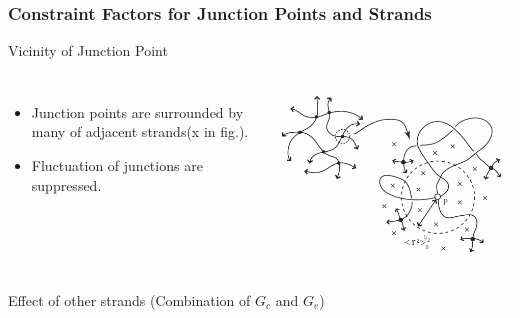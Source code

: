 \documentclass[12pt, dvipdfmx]{beamer}
\begin{document}
\begin{frame}
	\frametitle{Constraint Factors for Junction Points and Strands}
		\vspace{-2mm}
		\begin{alertblock}{Vicinity of Junction Point}
			\begin{columns}[totalwidth=1\textwidth]
				\vspace{-3mm}
				\begin{itemize}
					\item Junction points are surrounded by many of \alert{adjacent strands(x in fig.).}
					\item Fluctuation of junctions are \alert{suppressed}. 
				\end{itemize}
				\centering
				\includegraphics[width=\textwidth]{JP_vicinity.png}
			\end{columns}
		\end{alertblock}
		\vspace{-2mm}
		\begin{block}{Effect of other strands (Combination of $G_c$ and $G_e$)}
\end{block}
\end{frame}
\end{document}
